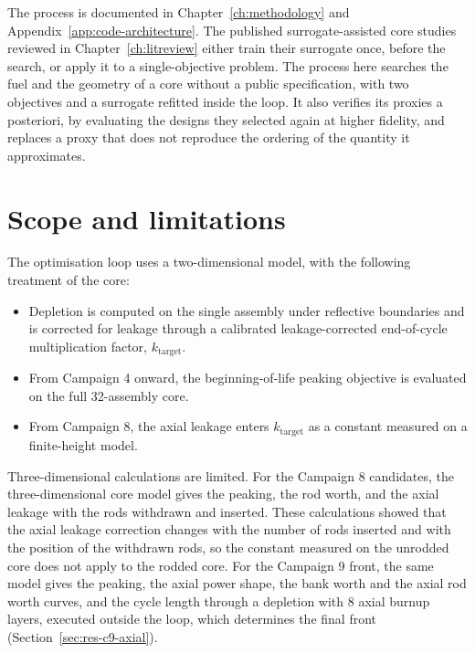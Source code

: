 The process is documented in Chapter~\ref{ch:methodology} and
Appendix~\ref{app:code-architecture}. The published surrogate-assisted
core studies reviewed in Chapter~\ref{ch:litreview} either train their
surrogate once, before the search, or apply it to a single-objective
problem. The process here searches the fuel and the geometry of a core
without a public specification, with two objectives and a surrogate
refitted inside the loop. It also verifies its proxies a posteriori,
by evaluating the designs they selected again at higher fidelity, and
replaces a proxy that does not reproduce the ordering of the quantity
it approximates.

\section{Scope and limitations}
\label{sec:intro-scope}

The optimisation loop uses a two-dimensional model, with the
following treatment of the core:

\begin{itemize}
  \item Depletion is computed on the single assembly under reflective
        boundaries and is corrected for leakage through a calibrated
        leakage-corrected end-of-cycle multiplication factor,
        $k_\mathrm{target}$.

  \item From Campaign 4 onward, the beginning-of-life peaking objective
        is evaluated on the full 32-assembly core.

  \item From Campaign 8, the axial leakage enters $k_\mathrm{target}$
        as a constant measured on a finite-height model.
\end{itemize}

Three-dimensional calculations are limited. For the Campaign 8 candidates,
the three-dimensional core model gives the peaking, the rod worth, and the
axial leakage with the rods withdrawn and inserted. These calculations
showed that the axial leakage correction changes with the number of rods
inserted and with the position of the withdrawn rods, so the constant
measured on the unrodded core does not apply to the rodded core. For the
Campaign 9 front, the same model gives the peaking, the axial power shape,
the bank worth and the axial rod worth curves, and the cycle length
through a depletion with 8 axial burnup layers, executed outside the
loop, which determines the final front (Section~\ref{sec:res-c9-axial}).

